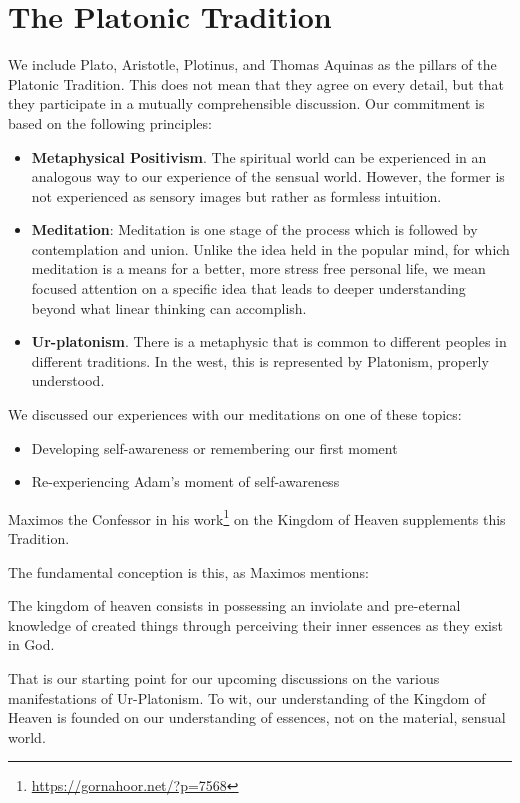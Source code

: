 \section{The Platonic Tradition}

We include Plato, Aristotle, Plotinus, and Thomas Aquinas as the pillars of the Platonic Tradition. This does not mean that they agree on every detail, but that they participate in a mutually comprehensible discussion. Our commitment is based on the following principles:

\begin{itemize}
\item \textbf{Metaphysical Positivism}. The spiritual world can be experienced in an analogous way to our experience of the sensual world. However, the former is not experienced as sensory images but rather as formless intuition. 
\item \textbf{Meditation}: Meditation is one stage of the process which is followed by contemplation and union. Unlike the idea held in the popular mind, for which meditation is a means for a better, more stress free personal life, we mean focused attention on a specific idea that leads to deeper understanding beyond what linear thinking can accomplish. 
\item \textbf{Ur-platonism}. There is a metaphysic that is common to different peoples in different traditions. In the west, this is represented by Platonism, properly understood. 
\end{itemize}
We discussed our experiences with our meditations on one of these topics:

\begin{itemize}
\item Developing self-awareness or remembering our first moment 
\item Re-experiencing Adam's moment of self-awareness 
\end{itemize}
Maximos the Confessor in his work\footnote{\url{https://gornahoor.net/?p=7568}} on the Kingdom of Heaven supplements this Tradition.

The fundamental conception is this, as Maximos mentions:

\begin{quotex}
The kingdom of heaven consists in possessing an inviolate and pre-eternal knowledge of created things through perceiving their inner essences as they exist in God. 

\end{quotex}
That is our starting point for our upcoming discussions on the various manifestations of Ur-Platonism. To wit, our understanding of the Kingdom of Heaven is founded on our understanding of essences, not on the material, sensual world.

